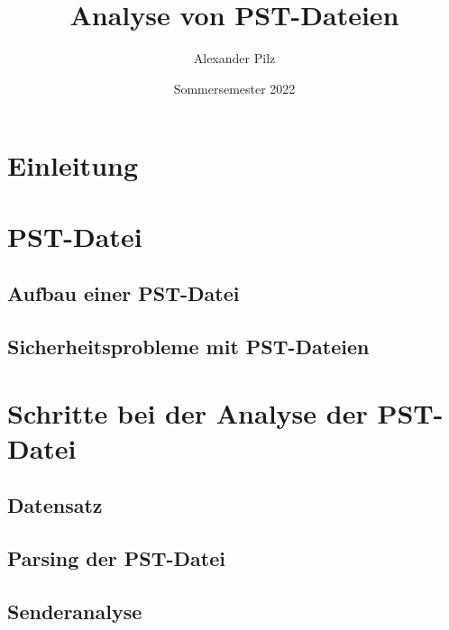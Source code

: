 \documentclass[oneside, 11pt, notitlepage, a4paper, numbers=noenddot]{scrartcl}
\title {Analyse von PST-Dateien}
\author{Alexander Pilz}
\date  {Sommersemester 2022}
\begin{document}
\maketitle

\section{Einleitung}

\label{Einleitung}

\section{PST-Datei}

\label{PST-Datei}

\subsection{Aufbau einer PST-Datei}

\label{Aufbau einer PST-Datei}

\subsection{Sicherheitsprobleme mit PST-Dateien}

\label{Sicherheitsprobleme mit PST-Dateien}

\section{Schritte bei der Analyse der PST-Datei}

\label{Schritte bei der Analyse der PST-Datei}

\subsection{Datensatz}

\label{Datensatz}

\subsection{Parsing der PST-Datei}

\label{Parsing der PST-Datei}

\subsection{Senderanalyse}

\label{Senderanalyse}
\end{document}
